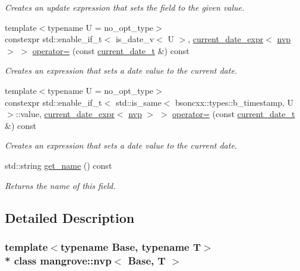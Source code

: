 \begin{DoxyCompactItemize}
\begin{DoxyCompactList}\small\item\em Creates an update expression that sets the field to the given value. \end{DoxyCompactList}\item 
{\footnotesize template$<$typename U  = no\+\_\+opt\+\_\+type$>$ }\\constexpr std\+::enable\+\_\+if\+\_\+t$<$ is\+\_\+date\+\_\+v$<$ U $>$, \hyperlink{classmangrove_1_1current__date__expr}{current\+\_\+date\+\_\+expr}$<$ \hyperlink{classmangrove_1_1nvp}{nvp} $>$ $>$ \hyperlink{classmangrove_1_1nvp_a26d1d81df8457fb4f6be626c54146543}{operator=} (const \hyperlink{structmangrove_1_1current__date__t}{current\+\_\+date\+\_\+t} \&) const 
\begin{DoxyCompactList}\small\item\em Creates an expression that sets a date value to the current date. \end{DoxyCompactList}\item 
{\footnotesize template$<$typename U  = no\+\_\+opt\+\_\+type$>$ }\\constexpr std\+::enable\+\_\+if\+\_\+t$<$ std\+::is\+\_\+same$<$ bsoncxx\+::types\+::b\+\_\+timestamp, U $>$\+::value, \hyperlink{classmangrove_1_1current__date__expr}{current\+\_\+date\+\_\+expr}$<$ \hyperlink{classmangrove_1_1nvp}{nvp} $>$ $>$ \hyperlink{classmangrove_1_1nvp_a20bf9b9e5279bfbbd3f706a113d724c4}{operator=} (const \hyperlink{structmangrove_1_1current__date__t}{current\+\_\+date\+\_\+t} \&) const 
\begin{DoxyCompactList}\small\item\em Creates an expression that sets a date value to the current date. \end{DoxyCompactList}\item 
std\+::string \hyperlink{classmangrove_1_1nvp_afd600a7d354d1d5e611df1cdfdac3593}{get\+\_\+name} () const 
\begin{DoxyCompactList}\small\item\em Returns the name of this field. \end{DoxyCompactList}\end{DoxyCompactItemize}


\subsection{Detailed Description}
\subsubsection*{template$<$typename Base, typename T$>$\\*
class mangrove\+::nvp$<$ Base, T $>$}

